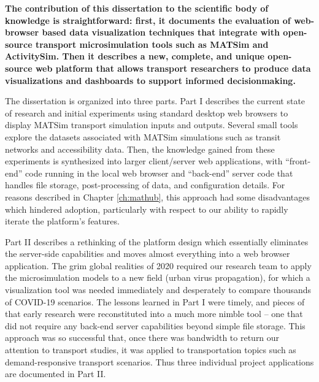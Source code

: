\textbf{The contribution of this dissertation to the scientific body of knowledge is straightforward: first, it documents the evaluation of web-browser based data visualization techniques that integrate with open-source transport microsimulation tools such as MATSim and ActivitySim. Then it describes a new, complete, and unique open-source web platform that allows transport researchers to produce data visualizations and dashboards to support informed decisionmaking.}

The dissertation is organized into three parts. Part I describes the current state of research and initial experiments using standard desktop web browsers to display MATSim transport simulation inputs and outputs. Several small tools explore the datasets associated with MATSim simulations such as transit networks and accessibility data. Then, the knowledge gained from these experiments is synthesized into larger client/server web applications, with ``front-end'' code running in the local web browser and ``back-end'' server code that handles file storage, post-processing of data, and configuration details. For reasons described in Chapter \ref{ch:mathub}, this approach had some disadvantages which hindered adoption, particularly with respect to our ability to rapidly iterate the platform's features.

Part II describes a rethinking of the platform design which essentially eliminates the server-side capabilities and moves almost everything into a web browser application. The grim global realities of 2020 required our research team to apply the microsimulation models to a new field (urban virus propagation), for which a visualization tool was needed immediately and desperately to compare thousands of COVID-19 scenarios. The lessons learned in Part I were timely, and pieces of that early research were reconstituted into a much more nimble tool -- one that did not require any back-end server capabilities beyond simple file storage. This approach was so successful that, once there was bandwidth to return our attention to transport studies, it was applied to transportation topics such as demand-responsive transport scenarios. Thus three individual project applications are documented in Part II.

